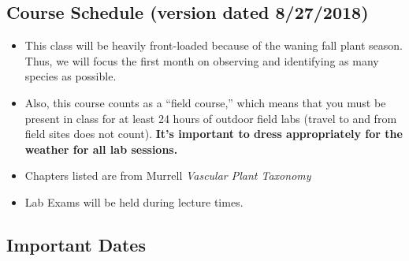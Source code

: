 \documentclass{tufte-handout}
\begin{document}
\begin{fullwidth}







\section{Course Schedule (version dated 8/27/2018)}

\begin{itemize}
	\item This class will be heavily front-loaded because of the waning fall plant season. Thus, we will focus the first month on observing and identifying as many species as possible.
	\item Also, this course counts as a ``field course,'' which means that you must be present in class for at least 24 hours of outdoor field labs (travel to and from field sites does not count). \textbf{It's important to dress appropriately for the weather for all lab sessions.}
	\item Chapters listed are from Murrell \emph{Vascular Plant Taxonomy}
	\item Lab Exams will be held during lecture times.
\end{itemize}

\subsection{Important Dates}


\end{fullwidth}
\end{document}
